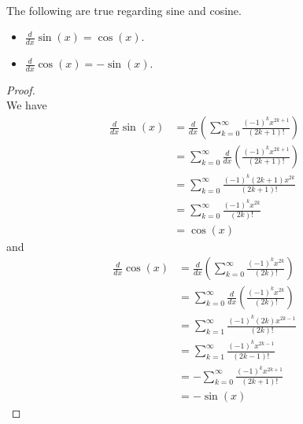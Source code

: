 \documentclass[a4paper]{article}
\begin{document}
\begin{lmm}{}{}\\
The following are true regarding sine and cosine. 
\begin{itemize}
\item $\frac{d}{dx}\sin(x)=\cos(x)$. 
\item $\frac{d}{dx}\cos(x)=-\sin(x)$. 
\end{itemize}
\begin{proof}\\
We have 
\begin{align*}
\frac{d}{dx}\sin(x)&=\frac{d}{dx}\left(\sum_{k=0}^\infty\frac{(-1)^kx^{2k+1}}{(2k+1)!}\right)\\
&=\sum_{k=0}^\infty\frac{d}{dx}\left(\frac{(-1)^kx^{2k+1}}{(2k+1)!}\right)\\
&=\sum_{k=0}^\infty\frac{(-1)^k(2k+1)x^{2k}}{(2k+1)!}\\
&=\sum_{k=0}^\infty\frac{(-1)^kx^{2k}}{(2k)!}\\
&=\cos(x)
\end{align*}
and 
\begin{align*}
\frac{d}{dx}\cos(x)&=\frac{d}{dx}\left(\sum_{k=0}^\infty\frac{(-1)^kx^{2k}}{(2k)!}\right)\\
&=\sum_{k=0}^\infty\frac{d}{dx}\left(\frac{(-1)^kx^{2k}}{(2k)!}\right)\\
&=\sum_{k=1}^\infty\frac{(-1)^k(2k)x^{2k-1}}{(2k)!}\\
&=\sum_{k=1}^\infty\frac{(-1)^kx^{2k-1}}{(2k-1)!}\\
&=-\sum_{k=0}^\infty\frac{(-1)^kx^{2k+1}}{(2k+1)!}\\
&=-\sin(x)
\end{align*}
\end{proof}
\end{lmm}
\end{document}
